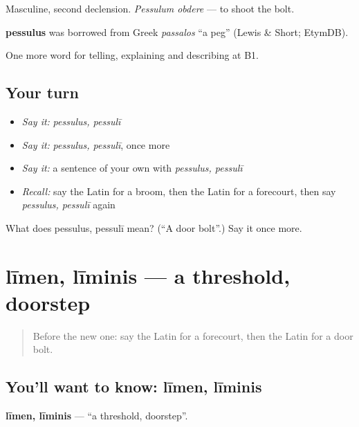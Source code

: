 Masculine, second declension. \emph{Pessulum obdere} — to shoot the bolt.

\begin{cousinweb}
\textbf{pessulus} was borrowed from Greek \emph{passalos} \textquotedblleft{}a peg\textquotedblright{} (Lewis \& Short; EtymDB).
\end{cousinweb}

\begin{grammarlens}[title={What you've built}]
One more word for telling, explaining and describing at B1.
\end{grammarlens}

\subsection*{Your turn}
\begin{itemize}
\raggedright
  \item \emph{Say it:} \emph{pessulus, pessulī}
  \item \emph{Say it:} \emph{pessulus, pessulī}, once more
  \item \emph{Say it:} a sentence of your own with \emph{pessulus, pessulī}
  \item \emph{Recall:} say the Latin for a broom, then the Latin for a forecourt, then say \emph{pessulus, pessulī} again
\end{itemize}

\begin{tcolorbox}[breakable,colback=teal!4,colframe=teal!35!black,title={Before you move on}]
What does pessulus, pessulī mean? (\textquotedblleft{}A door bolt\textquotedblright{}.) Say it once more.
\end{tcolorbox}
\section[līmen, līminis]{līmen, līminis — a threshold, doorstep}

\label{lesson:LA-C553-limen}



\begin{quote}
Before the new one: say the Latin for a forecourt, then the Latin for a door bolt.
\end{quote}

\subsection*{You'll want to know: līmen, līminis}
\textbf{līmen, līminis} — \textquotedblleft{}a threshold, doorstep\textquotedblright{}.


